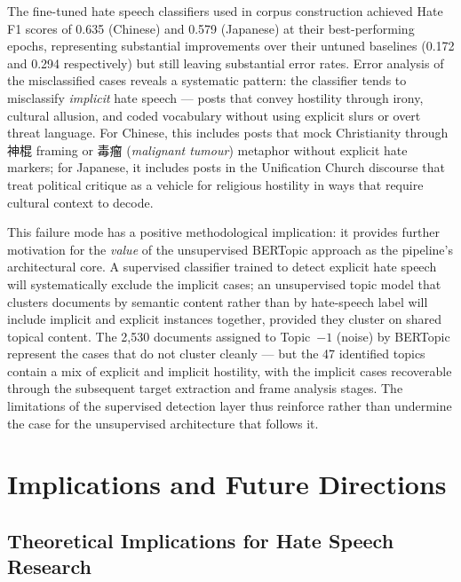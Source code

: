 \documentclass[../CLthesis.tex]{subfiles}
\begin{document}
The fine-tuned hate speech classifiers used in corpus construction achieved Hate F1 scores of 0.635 (Chinese) and 0.579 (Japanese) at their best-performing epochs, representing substantial improvements over their untuned baselines (0.172 and 0.294 respectively) but still leaving substantial error rates. Error analysis of the misclassified cases reveals a systematic pattern: the classifier tends to misclassify \emph{implicit} hate speech --- posts that convey hostility through irony, cultural allusion, and coded vocabulary without using explicit slurs or overt threat language. For Chinese, this includes posts that mock Christianity through 神棍 framing or 毒瘤 (\textit{malignant tumour}) metaphor without explicit hate markers; for Japanese, it includes posts in the Unification Church discourse that treat political critique as a vehicle for religious hostility in ways that require cultural context to decode.

This failure mode has a positive methodological implication: it provides further motivation for the \emph{value} of the unsupervised BERTopic approach as the pipeline's architectural core. A supervised classifier trained to detect explicit hate speech will systematically exclude the implicit cases; an unsupervised topic model that clusters documents by semantic content rather than by hate-speech label will include implicit and explicit instances together, provided they cluster on shared topical content. The 2,530 documents assigned to Topic~$-1$ (noise) by BERTopic represent the cases that do not cluster cleanly --- but the 47 identified topics contain a mix of explicit and implicit hostility, with the implicit cases recoverable through the subsequent target extraction and frame analysis stages. The limitations of the supervised detection layer thus reinforce rather than undermine the case for the unsupervised architecture that follows it.

\section{Implications and Future Directions}
\label{sec:discussion-implications}

\subsection{Theoretical Implications for Hate Speech Research}
\end{document}

